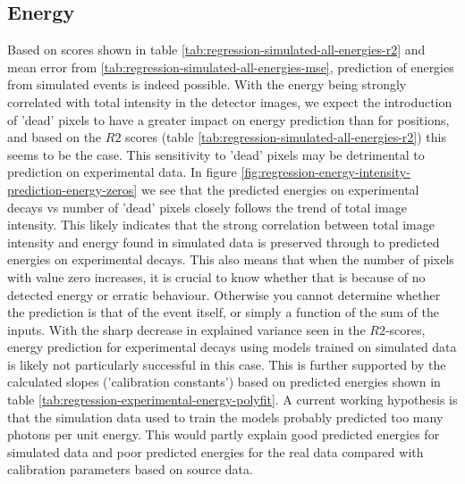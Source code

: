 \subsection{Energy}
Based on scores shown in table \ref{tab:regression-simulated-all-energies-r2} and mean error from
\ref{tab:regression-simulated-all-energies-mse}, prediction of energies from simulated events is
indeed possible. With the energy being strongly correlated with total intensity in the detector images,
we expect the introduction of 'dead' pixels to have a greater impact on energy prediction than for
positions, and based on the $R2$ scores (table \ref{tab:regression-simulated-all-energies-r2})
this seems to be the case. This sensitivity to 'dead' pixels may be detrimental to prediction on
experimental data. In figure \ref{fig:regression-energy-intensity-prediction-energy-zeros} we see
that the predicted energies on experimental decays vs number of 'dead' pixels closely follows the trend
of total image intensity. This likely indicates that the strong correlation between total image intensity
and energy found in simulated data is preserved through to predicted energies on experimental decays.
This also means that when the number of pixels with value zero increases, it is crucial to know
whether that is because of no detected energy or erratic behaviour. Otherwise you cannot determine
whether the prediction is that of the event itself, or simply a function of the sum of the
inputs. With the sharp decrease in explained variance seen in the $R2$-scores, energy prediction
for experimental decays using models trained on simulated data is likely not particularly successful
in this case. This is further supported by the calculated slopes ('calibration constants') based on 
predicted energies shown in table \ref{tab:regression-experimental-energy-polyfit}.
A current working hypothesis is that the simulation data used to train the models probably predicted too 
many photons per unit energy. This would partly explain good predicted energies for simulated data and
poor predicted energies for the real data compared with calibration parameters based on source data.